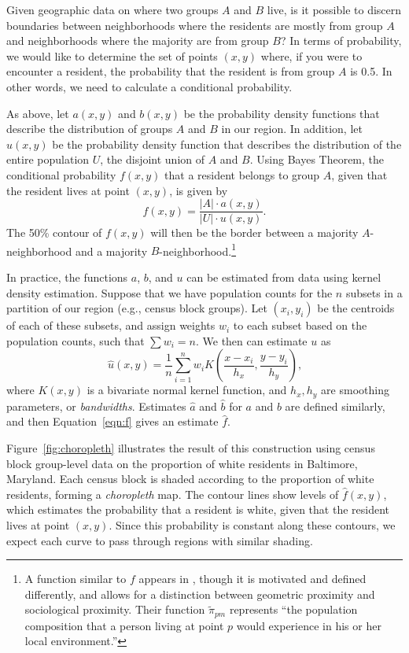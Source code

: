 \documentclass{article}
\theoremstyle{theorem}
\theoremstyle{definition}
\begin{document}
Given geographic data on where two groups $A$ and $B$ live, is it possible to discern boundaries between neighborhoods where the residents are mostly from group $A$ and neighborhoods where the majority are from group $B$? In terms of probability, we would like to determine the set of points $(x,y)$ where, if you were to encounter a resident, the probability that the resident is from group $A$ is 0.5. In other words, we need to calculate a conditional probability.

As above, let $a(x,y)$ and $b(x,y)$ be the probability density functions that describe the distribution of groups $A$ and $B$ in our region. In addition, let $u(x,y)$ be the probability density function that describes the distribution of the entire population $U$, the disjoint union of $A$ and $B$. Using Bayes Theorem, the conditional probability $f(x,y)$ that a resident belongs to group $A$, given that the resident lives at point $(x,y)$, is given by
\begin{equation}\label{eqn:f}
  f(x,y) = \frac{\lvert A\rvert\cdot a(x,y)}{\lvert U\rvert \cdot u(x,y)}\text{.}
\end{equation}
The 50\% contour of $f(x,y)$ will then be the border between a majority $A$-neighborhood and a majority $B$-neighborhood.\footnote{A function similar to $f$ appears in \cite{reardonosullivan04}, though it is motivated and defined differently, and allows for a distinction between geometric proximity and sociological proximity. Their function $\tilde{\pi}_{pm}$ represents ``the population composition that a person living at point $p$ would experience in his or her local environment.''}

In practice, the functions $a$, $b$, and $u$ can be estimated from data using kernel density estimation. Suppose that we have population counts for the $n$ subsets in a partition of our region (e.g., census block groups). Let $(x_i, y_i)$ be the centroids of each of these subsets, and assign weights $w_i$ to each subset based on the population counts, such that $\sum w_i = n$. We then can estimate $u$ as
$$
\hat{u}(x,y) = \frac{1}{n} \sum_{i=1}^n w_i K\left(\frac{x-x_i}{h_x}, \frac{y-y_i}{h_y} \right)\text{,}
$$
where $K(x,y)$ is a bivariate normal kernel function, and $h_x, h_y$ are smoothing parameters, or \textit{bandwidths}. Estimates $\hat{a}$ and $\hat{b}$ for $a$ and $b$ are defined similarly, and then Equation~\ref{eqn:f} gives an estimate $\hat{f}$.

Figure~\ref{fig:choropleth} illustrates the result of this construction using census block group-level data on the proportion of white residents in Baltimore, Maryland. Each census block is shaded according to the proportion of white residents, forming a \textit{choropleth} map. The contour lines show levels of $\hat{f}(x,y)$, which estimates the probability that a resident is white, given that the resident lives at point $(x,y)$. Since this probability is constant along these contours, we expect each curve to pass through regions with similar shading.
\end{document}
